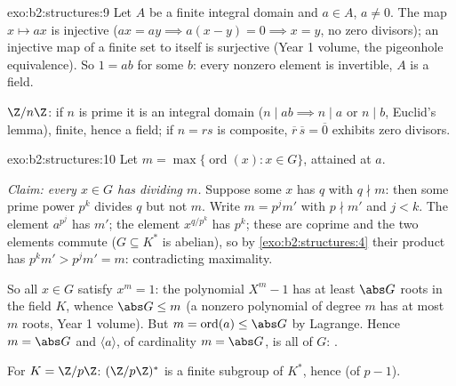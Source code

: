 \begin{solution}{exo:b2:structures:9}
Let $A$ be a finite integral domain and $a \in A$, $a \neq 0$. The
map $x \mapsto ax$ is injective ($ax = ay \implies a(x - y) = 0
\implies x = y$, no zero divisors); an injective map of a finite set
to itself is surjective (Year 1 volume, the pigeonhole equivalence).
So $1 = ab$ for some $b$: every nonzero element is invertible, $A$
is a field.

$\Z/n\Z$: if $n$ is prime it is an integral domain ($n \mid ab
\implies n \mid a$ or $n \mid b$, Euclid's lemma), finite, hence a
field; if $n = rs$ is composite, $\overline r\,\overline s =
\overline 0$ exhibits zero divisors.
\end{solution}

\begin{solution}{exo:b2:structures:10}
Let $m = \max\{\operatorname{ord}(x) : x \in G\}$, attained at $a$.

\emph{Claim: every $x \in G$ has  dividing $m$.} Suppose some
$x$ has  $q$ with $q \nmid m$: then some prime power $p^k$
divides $q$ but not $m$. Write $m = p^j m'$ with $p \nmid m'$ and $j
< k$. The element $a^{p^j}$ has  $m'$; the element
$x^{q/p^k}$ has  $p^k$; these  are coprime and the two
elements commute ($G \subseteq K^*$ is abelian), so by
\cref{exo:b2:structures:4} their product has  $p^k m' > p^j m'
= m$: contradicting maximality.

So all $x \in G$ satisfy $x^m = 1$: the polynomial $X^m - 1$ has at
least $\abs G$ roots in the field $K$, whence $\abs G \leq m$
(a nonzero polynomial of degree $m$ has at most $m$ roots, Year 1
volume). But $m = \operatorname{ord}(a) \leq \abs G$ by Lagrange.
Hence $m = \abs G$ and $\langle a \rangle$, of cardinality $m =
\abs G$, is all of $G$: .

For $K = \Z/p\Z$: $(\Z/p\Z)^*$ is a finite subgroup of $K^*$, hence
 (of  $p - 1$).
\end{solution}

